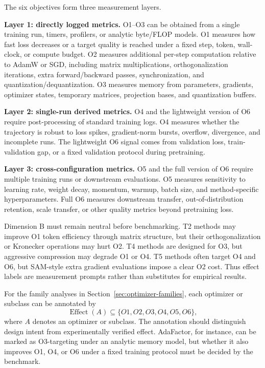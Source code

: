 The six objectives form three measurement layers.

\textbf{Layer 1: directly logged metrics.}
O1--O3 can be obtained from a single training run, timers, profilers, or
analytic byte/FLOP models.  O1 measures how fast loss decreases or a target
quality is reached under a fixed step, token, wall-clock, or compute budget.
O2 measures additional per-step computation relative to AdamW or SGD,
including matrix multiplications, orthogonalization iterations, extra
forward/backward passes, synchronization, and quantization/dequantization.
O3 measures memory from parameters, gradients, optimizer states, temporary
matrices, projection bases, and quantization buffers.

\textbf{Layer 2: single-run derived metrics.}
O4 and the lightweight version of O6 require post-processing of standard
training logs.  O4 measures whether the trajectory is robust to loss spikes,
gradient-norm bursts, overflow, divergence, and incomplete runs.  The
lightweight O6 signal comes from validation loss, train-validation gap, or a
fixed validation protocol during pretraining.

\textbf{Layer 3: cross-configuration metrics.}
O5 and the full version of O6 require multiple training runs or downstream
evaluations.  O5 measures sensitivity to learning rate, weight decay,
momentum, warmup, batch size, and method-specific hyperparameters.  Full O6
measures downstream transfer, out-of-distribution retention, scale transfer,
or other quality metrics beyond pretraining loss.




Dimension B must remain neutral before benchmarking.  T2 methods may improve
O1 token efficiency through matrix structure, but their orthogonalization or
Kronecker operations may hurt O2.  T4 methods are designed for O3, but
aggressive compression may degrade O1 or O4.  T5 methods often target O4 and
O6, but SAM-style extra gradient evaluations impose a clear O2 cost.  Thus
effect labels are measurement prompts rather than substitutes for empirical
results.

For the family analyses in Section~\ref{sec:optimizer-families}, each
optimizer or subclass can be annotated by
\begin{equation}
  \operatorname{Effect}(A) \subseteq \{O1,O2,O3,O4,O5,O6\},
  \label{eq:effect-tags}
\end{equation}
where $A$ denotes an optimizer or subclass.  The annotation should distinguish
design intent from experimentally verified effect.  AdaFactor, for instance,
can be marked as O3-targeting under an analytic memory model, but whether it
also improves O1, O4, or O6 under a fixed training protocol must be decided
by the benchmark.

